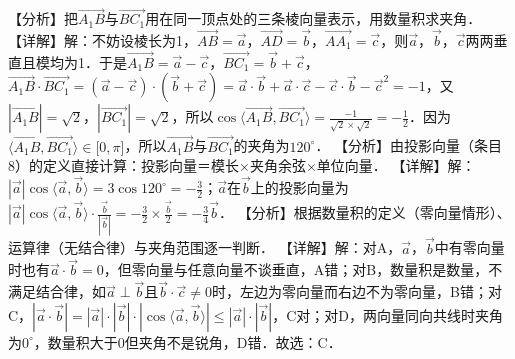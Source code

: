 【分析】把\(\overrightarrow{A_{1}B}\)与\(\overrightarrow{BC_{1}}\)用在同一顶点处的三条棱向量表示，用数量积求夹角．
【详解】解：不妨设棱长为1，\(\overrightarrow{AB} = \overrightarrow{a}\)，\(\overrightarrow{AD} = \overrightarrow{b}\)，\(\overrightarrow{AA_{1}} = \overrightarrow{c}\)，则\(\overrightarrow{a}\)，\(\overrightarrow{b}\)，\(\overrightarrow{c}\)两两垂直且模均为1．于是\(\overrightarrow{A_{1}B} = \overrightarrow{a} - \overrightarrow{c}\)，\(\overrightarrow{BC_{1}} = \overrightarrow{b} + \overrightarrow{c}\)，\(\overrightarrow{A_{1}B} \cdot \overrightarrow{BC_{1}} = \allowbreak\left( \overrightarrow{a} - \overrightarrow{c} \right) \cdot \allowbreak\left( \overrightarrow{b} + \overrightarrow{c} \right) = \overrightarrow{a} \cdot \overrightarrow{b} + \overrightarrow{a} \cdot \overrightarrow{c} - \overrightarrow{c} \cdot \overrightarrow{b} - {\overrightarrow{c}}^{2} = - 1\)，又\(\left| \overrightarrow{A_{1}B} \right| = \sqrt{2}\)，\(\left| \overrightarrow{BC_{1}} \right| = \sqrt{2}\)，所以\(\cos\langle \overrightarrow{A_{1}B},\overrightarrow{BC_{1}} \rangle = \frac{- 1}{\sqrt{2} \times \sqrt{2}} = - \frac{1}{2}\)．因为\(\langle \overrightarrow{A_{1}B},\overrightarrow{BC_{1}} \rangle \in \lbrack 0,\pi\rbrack\)，所以\(\overrightarrow{A_{1}B}\)与\(\overrightarrow{BC_{1}}\)的夹角为\(120^{\circ}\)．
【分析】由投影向量（条目8）的定义直接计算：投影向量＝模长×夹角余弦×单位向量．
【详解】解：\(\left| \overrightarrow{a} \right|\cos\langle \overrightarrow{a},\overrightarrow{b} \rangle = 3\cos 120^{\circ} = - \frac{3}{2}\)；\(\overrightarrow{a}\)在\(\overrightarrow{b}\)上的投影向量为\(\left| \overrightarrow{a} \right|\cos\langle \overrightarrow{a},\overrightarrow{b} \rangle \cdot \frac{\overrightarrow{b}}{\left| \overrightarrow{b} \right|} = - \frac{3}{2} \times \frac{\overrightarrow{b}}{2} = - \frac{3}{4}\overrightarrow{b}\)．
【分析】根据数量积的定义（零向量情形）、运算律（无结合律）与夹角范围逐一判断．
【详解】解：对A，\(\overrightarrow{a}\)，\(\overrightarrow{b}\)中有零向量时也有\(\overrightarrow{a} \cdot \overrightarrow{b} = 0\)，但零向量与任意向量不谈垂直，A错；对B，数量积是数量，不满足结合律，如\(\overrightarrow{a} \perp \overrightarrow{b}\)且\(\overrightarrow{b} \cdot \overrightarrow{c} \neq 0\)时，左边为零向量而右边不为零向量，B错；对C，\(\left| \overrightarrow{a} \cdot \overrightarrow{b} \right| = \allowbreak\left| \overrightarrow{a} \right| \cdot \allowbreak\left| \overrightarrow{b} \right| \cdot \allowbreak\left| \cos\langle \overrightarrow{a},\overrightarrow{b} \rangle \right| \leq \left| \overrightarrow{a} \right| \cdot \allowbreak\left| \overrightarrow{b} \right|\)，C对；对D，两向量同向共线时夹角为\(0^{\circ}\)，数量积大于0但夹角不是锐角，D错．故选：C．

